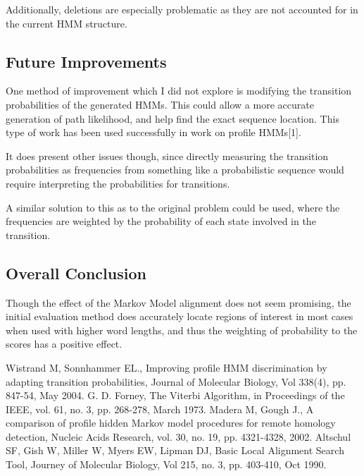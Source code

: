 \documentclass[12pt, conference]{IEEEtran}
\begin{document}
	Additionally, deletions are especially problematic as they are not accounted for in the current HMM structure.

	\subsection{\textbf{Future Improvements}}
	
	One method of improvement which I did not explore is modifying the transition probabilities of the generated HMMs. This could allow a more accurate generation of path likelihood, and help find the exact sequence location. This type of work has been used successfully in work on profile HMMs[1].
	
	It does present other issues though, since directly measuring the transition probabilities as frequencies from something like a probabilistic sequence would require interpreting the probabilities for transitions. 
	
	A similar solution to this as to the original problem could be used, where the frequencies are weighted by the probability of each state involved in the transition.
	
	\subsection{\textbf{Overall Conclusion}}
	
	Though the effect of the Markov Model alignment does not seem promising, the initial evaluation method does accurately locate regions of interest in most cases when used with higher word lengths, and thus the weighting of probability to the scores has a positive effect.

\begin{thebibliography}{00}
 Wistrand M, Sonnhammer EL., Improving profile HMM discrimination by adapting transition probabilities, Journal of Molecular Biology, Vol 338(4), pp. 847-54, May 2004.
 G. D. Forney, The Viterbi Algorithm, in Proceedings of the IEEE, vol. 61, no. 3, pp. 268-278, March 1973.
 Madera M, Gough J., A comparison of profile hidden Markov model procedures for remote homology detection, Nucleic Acids Research, vol. 30, no. 19, pp. 4321-4328, 2002.
 Altschul SF, Gish W, Miller W, Myers EW, Lipman DJ, Basic Local Alignment Search Tool, Journey of Molecular Biology, Vol 215, no. 3, pp. 403-410, Oct 1990.
\end{thebibliography}
\end{document}
